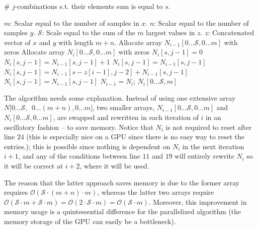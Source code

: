 \documentclass[a4paper]{article}
\begin{document}
\FloatBarrier
\begin{algorithm}
\caption{\# $j$-combinations s.t. their elements sum is equal to $s$.}
\label{alg:combination}
\begin{algorithmic}[1]
\State $m$: Scalar equal to the number of samples in $x$.
\State $n$: Scalar equal to the number of samples $y$.
\State $\mathcal{S}$: Scale equal to the sum of the $m$ largest values in $z$.
\State $z$: Concatenated vector of $x$ and $y$ with length $m+n$.
    \State Allocate array $N_{i-1}[0...\mathcal{S},0...m]$ with zeros 
    \State Allocate array $N_{i}[0...\mathcal{S},0...m]$ with zeros
                  \State $N_{i}[s,j-1]=0$ 
                  \State $N_{i}[s,j-1]=N_{i-1}[s,j-1] + 1$
                 \State $N_{i}[s,j-1]=N_{i-1}[s,j-1]$ 
                  \State $N_{i}[s,j-1]=N_{i-1}[s-z[i-1],j-2] + N_{i-1}[s,j-1]$ 
                 \State $N_{i}[s,j-1]=N_{i-1}[s,j-1]$
                \EndIf
            \EndFor
        \EndFor
        \State $N_{i-1} = N_{i}$; 
    \EndFor
        \State \Return $N_{i}[0...\mathcal{S},m]$ 
        
    \EndProcedure
\end{algorithmic}
\end{algorithm}
\FloatBarrier

The algorithm needs some explanation. Instead of using one extensive array $N[0\ldots \mathcal{S},$\ $0\ldots(m+n),0\ldots m]$, two smaller arrays, $N_{i-1}[0...\mathcal{S},0...m]$ and $N_{i}[0...\mathcal{S},0...m]$, are swapped and rewritten in each iteration of $i$ in an oscillatory fashion – to save memory. Notice that $N_{i}$ is not required to reset after line $24$ (this is especially nice on a GPU since there is no easy way to reset the entries.); this is possible since nothing is dependent on $N_{i}$ in the next iteration $i+1$, and any of the conditions between line $11$ and $19$ will entirely rewrite $N_{i}$ so it will be correct at $i+2$, where it will be used. 

The reason that the latter approach saves memory is due to the former array requires $\mathcal{O}(\mathcal{S} \cdot (m+n) \cdot m)$, whereas the latter two arrays require $\mathcal{O}(\mathcal{S} \cdot m + \mathcal{S} \cdot m) = \mathcal{O}( 2 \cdot \mathcal{S} \cdot m)=\mathcal{O}(\mathcal{S} \cdot m)$. Moreover, this improvement in memory usage is a quintessential difference for the parallelized algorithm (the memory storage of the GPU can easily be a bottleneck). 
\end{document}

